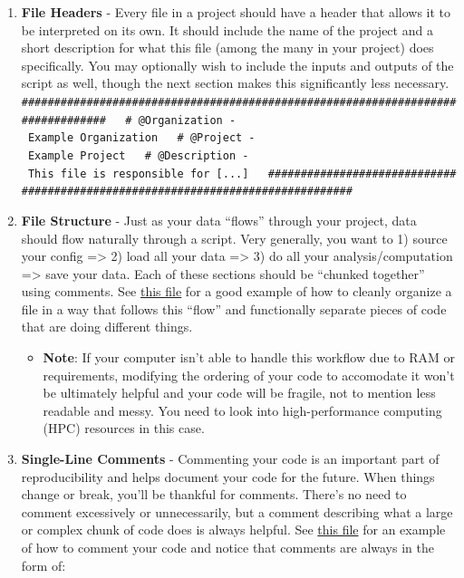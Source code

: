 \documentclass[]{book}
\providecommand{\tightlist}{%
  \setlength{\itemsep}{0pt}\setlength{\parskip}{0pt}}
\begin{document}
\begin{enumerate}
\def\labelenumi{\arabic{enumi}.}
\tightlist
\item
  \textbf{File Headers} - Every file in a project should have a header
  that allows it to be interpreted on its own. It should include the
  name of the project and a short description for what this file (among
  the many in your project) does specifically. You may optionally wish
  to include the inputs and outputs of the script as well, though the
  next section makes this significantly less necessary.
  \texttt{\#\#\#\#\#\#\#\#\#\#\#\#\#\#\#\#\#\#\#\#\#\#\#\#\#\#\#\#\#\#\#\#\#\#\#\#\#\#\#\#\#\#\#\#\#\#\#\#\#\#\#\#\#\#\#\#\#\#\#\#\#\#\#\#\#\#\#\#\#\#\#\#\#\#\#\#\#\#\#\#\ \ \ \#\ @Organization\ -\ Example\ Organization\ \ \ \#\ @Project\ -\ Example\ Project\ \ \ \#\ @Description\ -\ This\ file\ is\ responsible\ for\ {[}...{]}\ \ \ \#\#\#\#\#\#\#\#\#\#\#\#\#\#\#\#\#\#\#\#\#\#\#\#\#\#\#\#\#\#\#\#\#\#\#\#\#\#\#\#\#\#\#\#\#\#\#\#\#\#\#\#\#\#\#\#\#\#\#\#\#\#\#\#\#\#\#\#\#\#\#\#\#\#\#\#\#\#\#\#}
\item
  \textbf{File Structure} - Just as your data ``flows'' through your
  project, data should flow naturally through a script. Very generally,
  you want to 1) source your config =\textgreater{} 2) load all your
  data =\textgreater{} 3) do all your analysis/computation
  =\textgreater{} save your data. Each of these sections should be
  ``chunked together'' using comments. See
  \href{https://github.com/kmishra9/Flu-Absenteeism/blob/master/Master's\%20Thesis\%20-\%20Spatial\%20Epidemiology\%20of\%20Influenza/2a\%20-\%20Statistical-Inputs.R}{this
  file} for a good example of how to cleanly organize a file in a way
  that follows this ``flow'' and functionally separate pieces of code
  that are doing different things.

  \begin{itemize}
  \tightlist
  \item
    \textbf{Note}: If your computer isn't able to handle this workflow
    due to RAM or requirements, modifying the ordering of your code to
    accomodate it won't be ultimately helpful and your code will be
    fragile, not to mention less readable and messy. You need to look
    into high-performance computing (HPC) resources in this case.
  \end{itemize}
\item
  \textbf{Single-Line Comments} - Commenting your code is an important
  part of reproducibility and helps document your code for the future.
  When things change or break, you'll be thankful for comments. There's
  no need to comment excessively or unnecessarily, but a comment
  describing what a large or complex chunk of code does is always
  helpful. See
  \href{https://github.com/kmishra9/Flu-Absenteeism/blob/master/Master's\%20Thesis\%20-\%20Spatial\%20Epidemiology\%20of\%20Influenza/1b\%20-\%20Map-Management.R}{this
  file} for an example of how to comment your code and notice that
  comments are always in the form of:
\end{enumerate}
\end{document}
